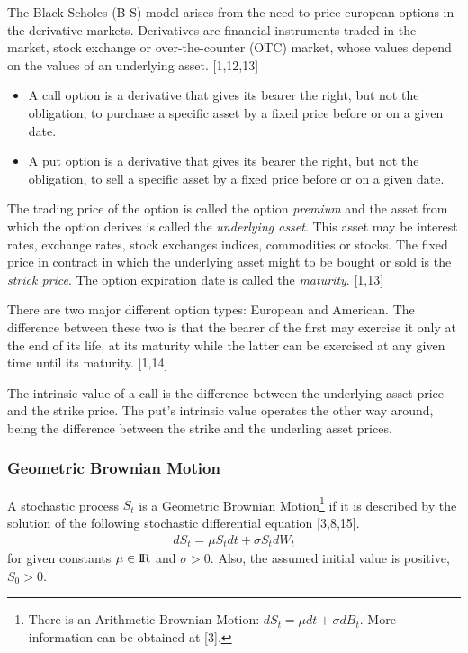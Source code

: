 \documentclass[12pt,twoside]{reedthesis}
\theoremstyle{definition}
\theoremstyle{definition}
\theoremstyle{remark}
\let\BeginKnitrBlock\begin \let\EndKnitrBlock\end
\begin{document}
  The Black-Scholes (B-S) model arises from the need to price european
  options in the derivative markets. Derivatives are financial instruments
  traded in the market, stock exchange or over-the-counter (OTC) market,
  whose values depend on the values of an underlying asset. {[}1,12,13{]}
  \begin{itemize}
  \item
    A call option is a derivative that gives its bearer the right, but not
    the obligation, to purchase a specific asset by a fixed price before
    or on a given date.
  \item
    A put option is a derivative that gives its bearer the right, but not
    the obligation, to sell a specific asset by a fixed price before or on
    a given date.
  \end{itemize}
  The trading price of the option is called the option \emph{premium} and
  the asset from which the option derives is called the \emph{underlying
  asset}. This asset may be interest rates, exchange rates, stock
  exchanges indices, commodities or stocks. The fixed price in contract in
  which the underlying asset might to be bought or sold is the
  \emph{strick price}. The option expiration date is called the
  \emph{maturity}. {[}1,13{]}
  
  There are two major different option types: European and American. The
  difference between these two is that the bearer of the first may
  exercise it only at the end of its life, at its maturity while the
  latter can be exercised at any given time until its maturity. {[}1,14{]}
  
  \BeginKnitrBlock{definition}[Intrinsic value]
  
  \protect\hypertarget{def:unnamed-chunk-3}{}{\label{def:unnamed-chunk-3}
  {} }The intrinsic value of a call is the
  difference between the underlying asset price and the strike price. The
  put's intrinsic value operates the other way around, being the
  difference between the strike and the underling asset prices.
  
  \EndKnitrBlock{definition}
  
  \subsubsection{Geometric Brownian Motion}\label{gbm}
  
  A stochastic process \(S_t\) is a Geometric Brownian Motion\footnote{There
    is an Arithmetic Brownian Motion: \(dS_t = \mu dt + \sigma dB_t\).
    More information can be obtained at {[}3{]}.} if it is described by
  the solution of the following stochastic differential equation
  {[}3,8,15{]}.
  \begin{align}
  dS_t = \mu S_t dt + \sigma S_t dW_t
  \end{align}
  \noindent
  for given constants \(\mu \in {\rm I\!R}\) and \(\sigma > 0\). Also, the
  assumed initial value is positive, \(S_0 >0\).
  
\end{document}
